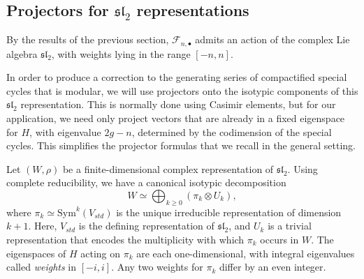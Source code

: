 \documentclass[11pt,letterpaper,english]{amsart}
\numberwithin{equation}{subsection}
\numberwithin{equation}{section}
\newcommand\cF{{\mathcal F}}
\theoremstyle{plain}
\theoremstyle{remark}
\begin{document}
\subsection{Projectors for $\mathfrak{sl}_2$ representations}

By the results of the previous section, $\cF_{n,\bullet}$ admits an action of the complex Lie algebra $\mathfrak{sl}_2$, with weights lying in the range $[-n,n]$. 

In order to produce a correction to the generating series of compactified special cycles that is modular, we will use projectors onto the isotypic components of this $\mathfrak{sl}_2$ representation. This is normally done using Casimir elements, but for our application, we need only project vectors that are already in a fixed eigenspace for $H$, with eigenvalue $2g-n$, determined by the codimension of the special cycles. This simplifies the projector formulas that we recall in the general setting.

Let $(W,\rho)$ be a finite-dimensional complex representation of $\mathfrak{sl}_2$. Using complete reducibility, we have a canonical isotypic decomposition
$$W \simeq \bigoplus_{k\geq 0} (\pi_k \otimes U_k),$$
where $\pi_k \simeq \mathrm{Sym}^k(V_{std})$ is the unique irreducible representation of dimension $k+1$. Here, $V_{std}$ is the defining representation of $\mathfrak{sl}_2$, and $U_k$ is a trivial representation that encodes the multiplicity with which $\pi_k$ occurs in $W$. The eigenspaces of $H$ acting on $\pi_k$ are each one-dimensional, with integral eigenvalues called {\it weights} in $[-i,i]$. Any two weights for $\pi_k$ differ by an even integer.
\end{document}
